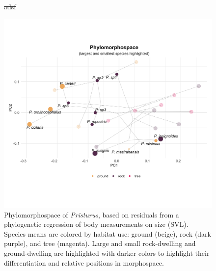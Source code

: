 \documentclass[
  11pt,
]{article}
\providecommand{\DIFdeltex}[1]{{\protect\color{red}\sout{#1}}}                      %
\providecommand{\DIFdelFL}[1]{\DIFdel{#1}} %
\providecommand{\DIFaddbeginFL}{} %
\providecommand{\DIFaddendFL}{} %
\providecommand{\DIFdelbeginFL}{} %
\providecommand{\DIFdelendFL}{} %
\providecommand{\DIFdel}[1]{\texorpdfstring{\DIFdeltex{#1}}{}} %
\newcommand{\DIFscaledelfig}{0.5}
\newlength{\DIFdelgraphicswidth} %
\newlength{\DIFdelgraphicsheight} %
\newcommand{\DIFaddincludegraphics}[2][]{{\color{blue}\fbox{\DIFOincludegraphics[#1]{#2}}}} %
\newcommand{\DIFdelincludegraphics}[2][]{%
\sbox{\DIFdelgraphicsbox}{\DIFOincludegraphics[#1]{#2}}%
\settoboxwidth{\DIFdelgraphicswidth}{\DIFdelgraphicsbox} %
\settoboxtotalheight{\DIFdelgraphicsheight}{\DIFdelgraphicsbox} %
\scalebox{\DIFscaledelfig}{%
\parbox[b]{\DIFdelgraphicswidth}{\usebox{\DIFdelgraphicsbox}\\[-\baselineskip] \rule{\DIFdelgraphicswidth}{0em}}\llap{\resizebox{\DIFdelgraphicswidth}{\DIFdelgraphicsheight}{%
\setlength{\unitlength}{\DIFdelgraphicswidth}%
\begin{picture}(1,1)%
\thicklines\linethickness{2pt} %
{\color[rgb]{1,0,0}\put(0,0){\framebox(1,1){}}}%
{\color[rgb]{1,0,0}\put(0,0){\line( 1,1){1}}}%
{\color[rgb]{1,0,0}\put(0,1){\line(1,-1){1}}}%
\end{picture}%
}\hspace*{3pt}}} %
} %
\DeclareRobustCommand{\DIFaddbeginFL}{\DIFOaddbeginFL \let\includegraphics\DIFaddincludegraphics} %
\DeclareRobustCommand{\DIFaddendFL}{\DIFOaddendFL \let\includegraphics\DIFOincludegraphics} %
\DeclareRobustCommand{\DIFdelbeginFL}{\DIFOdelbeginFL \let\includegraphics\DIFdelincludegraphics} %
\DeclareRobustCommand{\DIFdelendFL}{\DIFOaddendFL \let\includegraphics\DIFOincludegraphics} %
\begin{document}
\newpage

\begin{figure}
\DIFdelbeginFL %
{%
\DIFdelFL{adsf}}%


\DIFdelendFL \includegraphics[width=1\linewidth]{Figs/figure_5_phylomorphospace_large_small} \caption{Phylomorphospace of \textit{Pristurus}, based on residuals from a phylogenetic regression of body measurements on size (SVL). Species means are colored by habitat use: ground (beige), rock (dark purple), and tree (magenta). Large and small rock-dwelling and ground-dwelling are highlighted with darker colors to highlight their differentiation and relative positions in morphospace.}\DIFdelbeginFL %
\DIFdelendFL \DIFaddbeginFL \label{fig:unnamed-chunk-6}
\DIFaddendFL \end{figure}
\end{document}
